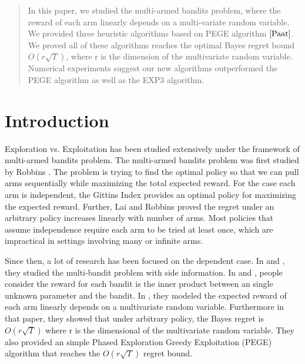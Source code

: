 \documentclass{article}
\theoremstyle{plain}
\theoremstyle{definition}
\begin{document}
 

\begin{abstract} 
In this paper, we studied the multi-armed bandits problem, where the reward of each arm linearly depends on a multi-variate random variable. We provided three heuristic algorithms based on PEGE algorithm $\cite{Paat}$. We proved all of these algorithms reaches the optimal Bayes regret bound $O(r\sqrt{T})$, where r is the dimension of the multivariate random variable. Numerical experiments suggest our new algorithms outperformed the PEGE algorithm as well as the EXP3 algorithm. 
\end{abstract} 


\section{Introduction}

Exploration vs. Exploitation has been studied extensively under the framework of multi-armed bandits problem. The multi-armed bandits problem was first studied by Robbins \cite{Robbins}. The problem is trying to find the optimal policy so that we can pull arms sequentially while maximizing the total expected reward. For the case each arm is independent, the Gittins Index \cite{Gittins} provides an optimal policy for maximizing the expected reward. Further, Lai and Robbins \cite{Lai} proved the regret under an arbitrary policy increases linearly with number of arms. Most policies that assume independence require each arm to be tried at least once, which are impractical in settings involving many or infinite arms. 

Since then, a lot of research has been focused on the dependent case. In \cite{Gabor} and \cite{Chih-Chun}, they studied the multi-bandit problem with side information. In \cite{Yasin1} and \cite{Yasin2}, people consider the reward for each bandit is the inner product between an single unknown parameter and the bandit. In \cite{Paat}, they modeled the expected reward of each arm linearly depends on a multivariate random variable. Furthermore in that paper, they showed that under arbitrary policy, the Bayes regret is $O(r\sqrt{T})$ where r is the dimensional of the multivariate random variable. They also provided an simple Phased Exploration Greedy Exploitation (PEGE) algorithm that reaches the $O(r\sqrt{T})$ regret bound.
\end{document}
